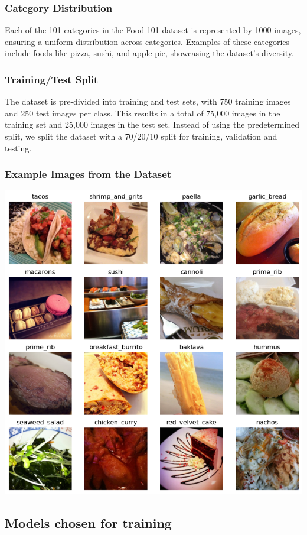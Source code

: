\documentclass{article}
\begin{document}
\subsubsection{Category Distribution}
Each of the 101 categories in the Food-101 dataset is represented by 1000 images, ensuring a uniform distribution across categories. Examples of these categories include foods like pizza, sushi, and apple pie, showcasing the dataset's diversity.

\subsubsection{Training/Test Split}
The dataset is pre-divided into training and test sets, with 750 training images and 250 test images per class. This results in a total of 75,000 images in the training set and 25,000 images in the test set. Instead of using the predetermined split, we split the dataset with a 70/20/10 split for training, validation and testing.

\subsubsection{Example Images from the Dataset}

\begin{center}
    \includegraphics[width=0.7\linewidth]{images/example-dataset-images.png}
\end{center}

\subsection{Models chosen for training}
\end{document}
